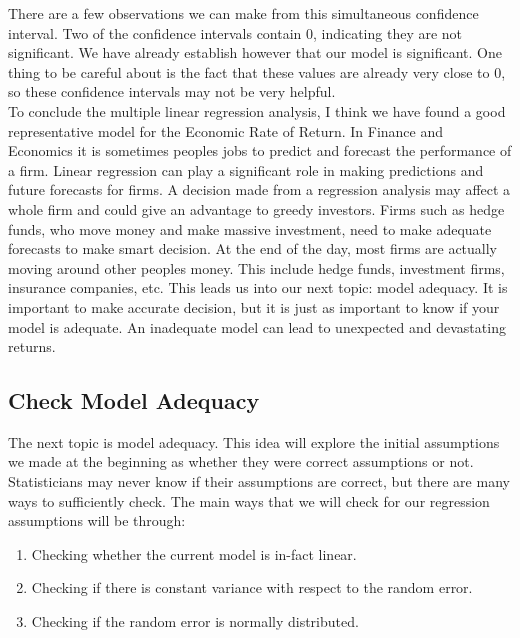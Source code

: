 \documentclass[12pt,letterpaper]{article}
\begin{document}
\begin{mdframed}

\end{mdframed}

There are a few observations we can make from this simultaneous confidence interval. Two of the confidence intervals contain 0, indicating they are not significant. We have already establish however that our model is significant. One thing to be careful about is the fact that these values are already very close to 0, so these confidence intervals may not be very helpful.\\[3mm]

To conclude the multiple linear regression analysis, I think we have found a good representative model for the Economic Rate of Return. In Finance and Economics it is sometimes peoples jobs to predict and forecast the performance of a firm. Linear regression can play a significant role in making predictions and future forecasts for firms. A decision made from a regression analysis may affect a whole firm and could give an advantage to greedy investors. Firms such as hedge funds, who move money and make massive investment, need to make adequate forecasts to make smart decision. At the end of the day, most firms are actually moving around other peoples money. This include hedge funds, investment firms, insurance companies, etc. This leads us into our next topic: model adequacy. It is important to make accurate decision, but it is just as important to know if your model is adequate. An inadequate model can lead to unexpected and devastating returns.

\subsection*{Check Model Adequacy}

The next topic is model adequacy. This idea will explore the initial assumptions we made at the beginning as whether they were correct assumptions or not. Statisticians may never know if their assumptions are correct, but there are many ways to sufficiently check. The main ways that we will check for our regression assumptions will be through:

\begin{enumerate}
\item Checking whether the current model is in-fact linear.

\item Checking if there is constant variance with respect to the random error.

\item Checking if the random error is normally distributed.
\end{enumerate}
\end{document}
